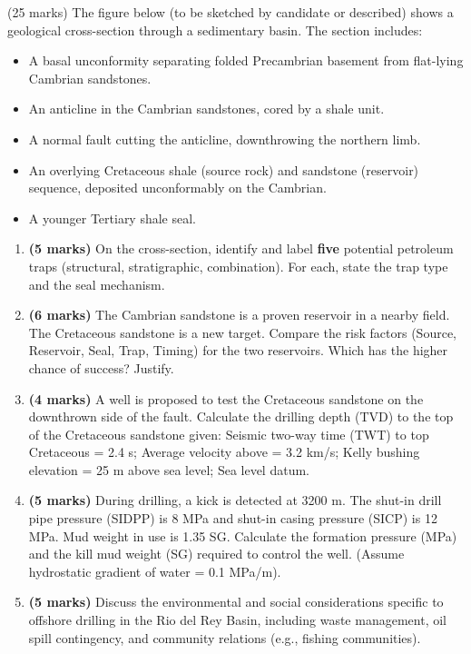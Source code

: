 \documentclass[11pt]{article}
\newcommand{\cle}[1]{{\popxbold\color{popdark}#1}}
\begin{document}
\begin{exercice} (25 marks)
The figure below (to be sketched by candidate or described) shows a geological cross-section through a sedimentary basin. The section includes:
\begin{itemize}
\item A basal unconformity separating folded Precambrian basement from flat-lying Cambrian sandstones.
\item An anticline in the Cambrian sandstones, cored by a shale unit.
\item A normal fault cutting the anticline, downthrowing the northern limb.
\item An overlying Cretaceous shale (source rock) and sandstone (reservoir) sequence, deposited unconformably on the Cambrian.
\item A younger Tertiary shale seal.
\end{itemize}

\begin{enumerate}
\item \textbf{(5 marks)} On the cross-section, identify and label \textbf{five} potential petroleum traps (structural, stratigraphic, combination). For each, state the trap type and the seal mechanism.
\item \textbf{(6 marks)} The Cambrian sandstone is a proven reservoir in a nearby field. The Cretaceous sandstone is a new target. Compare the \cle{risk factors} (Source, Reservoir, Seal, Trap, Timing) for the two reservoirs. Which has the higher chance of success? Justify.
\item \textbf{(4 marks)} A well is proposed to test the Cretaceous sandstone on the downthrown side of the fault. Calculate the \cle{drilling depth} (TVD) to the top of the Cretaceous sandstone given: Seismic two-way time (TWT) to top Cretaceous = 2.4 s; Average velocity above = 3.2 km/s; Kelly bushing elevation = 25 m above sea level; Sea level datum.
\item \textbf{(5 marks)} During drilling, a \cle{kick} is detected at 3200 m. The shut-in drill pipe pressure (SIDPP) is 8 MPa and shut-in casing pressure (SICP) is 12 MPa. Mud weight in use is 1.35 SG. Calculate the \cle{formation pressure} (MPa) and the \cle{kill mud weight} (SG) required to control the well. (Assume hydrostatic gradient of water = 0.1 MPa/m).
\item \textbf{(5 marks)} Discuss the environmental and social considerations specific to offshore drilling in the \cle{Rio del Rey Basin}, including waste management, oil spill contingency, and community relations (e.g., fishing communities).
\end{enumerate}
\end{exercice}
\end{document}
